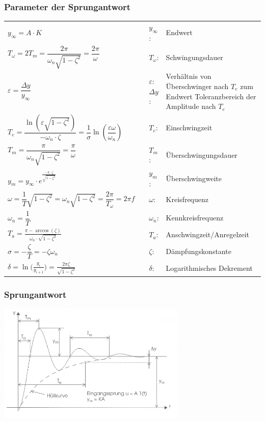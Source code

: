 \subsubsection{Parameter der Sprungantwort}
\renewcommand{\arraystretch}{1.8}
\begin{tabular}{|m{7cm}|m{1cm}m{0.5cm}m{8cm}}
  \cline{1-1}
  $y_{\infty} =A \cdot K$ & &
  $y_{\infty}$: & Endwert\\
  \cline{1-1}  
	$T_\omega = 2T_m=\dfrac{2\pi}{\omega_n \sqrt{1-\zeta^2}}=\dfrac{2\pi}{\omega}$ & &
	$T_{\omega}$: & Schwingungsdauer \\
  \cline{1-1}
	$\varepsilon = \dfrac{\Delta y}{y_{\infty}}$ & &
	\parbox{0.5cm}{
		$\varepsilon$:\\
		$\Delta y$:
	} & 
	\parbox{8cm}{
		Verhältnis von Überschwinger nach $T_e$ zum Endwert\\
		Toleranzbereich der Amplitude nach $T_e$
	}\\
	$T_e = \dfrac{\ln\left(\varepsilon\sqrt{1-\zeta^2}\right)}{-\omega_n\cdot\zeta} = 
	\dfrac{1}{\sigma}\ln\left(\dfrac{\varepsilon\omega}{\omega_n}\right)$ & &
	$T_e$: & Einschwingzeit \\
	$T_m = \dfrac{\pi}{\omega_n\sqrt{1-\zeta^2}}=\dfrac{\pi}{\omega}$ & &
	$T_m$: & Überschwingungsdauer\\
	$y_m = y_{\infty} \cdot e^{\frac{-\pi\cdot\zeta}{\sqrt{1-\zeta^2}}}$ & &
	$y_m$: & Überschwingweite\\
	$\omega = \dfrac{1}{T}\sqrt{1-\zeta^2}= \omega_n\sqrt{1-\zeta^2}=\dfrac{2\pi}{T_\omega}=2\pi f$ & &
	$\omega$: & Kreisfrequenz \\
	$\omega_n = \dfrac{1}{T}$ & &
	$\omega_n$: & Kennkreisfrequenz \\
	$T_a = \frac{\pi - \arccos{(\zeta)}}{\omega_n\cdot\sqrt{1-\zeta^2}}$ & &
	$T_a$: & Anschwingzeit/Anregelzeit \\
	$\sigma = -\dfrac{\zeta}{T} = -\zeta\omega_n$ & &
	$\zeta$: & Dämpfungskonstante \\
	$\delta = \ln{\Big(\frac{y_i}{y_{i+1}}\Big)} = \frac{2\pi \zeta}{\sqrt{1-\zeta^2}}$ & &
	$\delta$: & Logarithmisches Dekrement\\
\end{tabular}
\renewcommand{\arraystretch}{1}
	
\subsubsection{Sprungantwort}
\includegraphics[width = 9cm]{./images/pt2StepResp}

